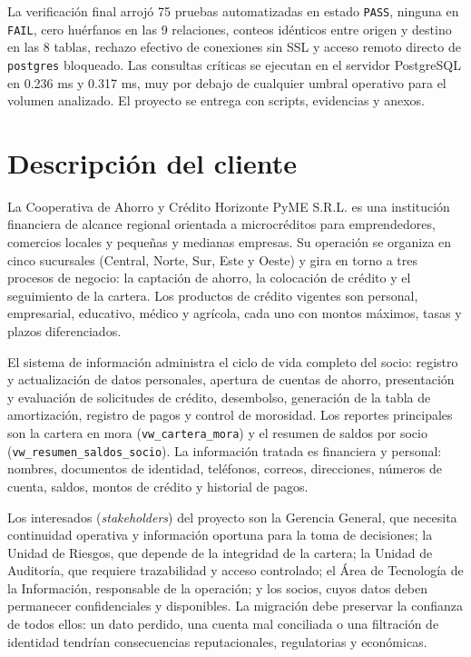 La verificación final arrojó 75 pruebas automatizadas en estado \texttt{PASS},
ninguna en \texttt{FAIL}, cero huérfanos en las 9 relaciones, conteos idénticos
entre origen y destino en las 8 tablas, rechazo efectivo de conexiones sin SSL
y acceso remoto directo de \texttt{postgres} bloqueado. Las consultas críticas
se ejecutan en el servidor PostgreSQL en 0.236 ms y 0.317 ms, muy por debajo de
cualquier umbral operativo para el volumen analizado. El proyecto se entrega
con scripts, evidencias y anexos.

\section{Descripción del cliente}

La Cooperativa de Ahorro y Crédito Horizonte PyME S.R.L. es una institución
financiera de alcance regional orientada a microcréditos para emprendedores,
comercios locales y pequeñas y medianas empresas. Su operación se organiza en
cinco sucursales (Central, Norte, Sur, Este y Oeste) y gira en torno a tres
procesos de negocio: la captación de ahorro, la colocación de crédito y el
seguimiento de la cartera. Los productos de crédito vigentes son personal,
empresarial, educativo, médico y agrícola, cada uno con montos máximos, tasas
y plazos diferenciados.

El sistema de información administra el ciclo de vida completo del socio:
registro y actualización de datos personales, apertura de cuentas de ahorro,
presentación y evaluación de solicitudes de crédito, desembolso, generación
de la tabla de amortización, registro de pagos y control de morosidad. Los
reportes principales son la cartera en mora (\texttt{vw\_cartera\_mora}) y el
resumen de saldos por socio (\texttt{vw\_resumen\_saldos\_socio}). La
información tratada es financiera y personal: nombres, documentos de identidad,
teléfonos, correos, direcciones, números de cuenta, saldos, montos de crédito
y historial de pagos.

Los interesados (\emph{stakeholders}) del proyecto son la Gerencia General,
que necesita continuidad operativa y información oportuna para la toma de
decisiones; la Unidad de Riesgos, que depende de la integridad de la cartera;
la Unidad de Auditoría, que requiere trazabilidad y acceso controlado; el
Área de Tecnología de la Información, responsable de la operación; y los
socios, cuyos datos deben permanecer confidenciales y disponibles. La
migración debe preservar la confianza de todos ellos: un dato perdido, una
cuenta mal conciliada o una filtración de identidad tendrían consecuencias
reputacionales, regulatorias y económicas.


